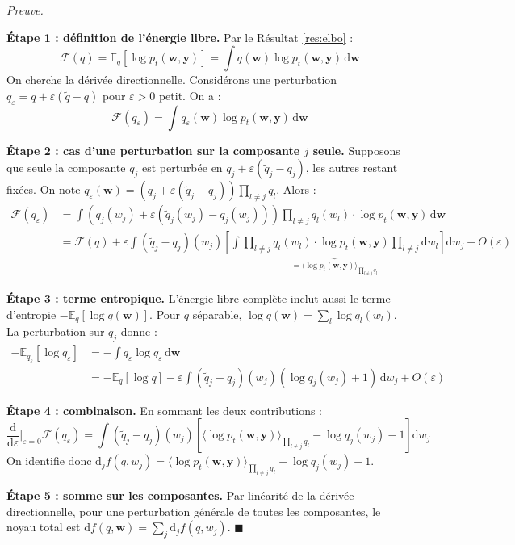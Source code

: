 \documentclass[12pt]{article}
\newcommand{\w}{\boldsymbol{w}}
\newcommand{\y}{\boldsymbol{y}}
\renewcommand{\qedsymbol}{$\blacksquare$}
\renewenvironment{proof}[1][\proofname]{%
  \par\medskip\noindent
  \textit{\color{proofgray}#1.}\enspace\ignorespaces
}{\hfill\qedsymbol\par\medskip}
\renewcommand{\proofname}{Preuve}
\begin{document}
\begin{proof}


\textbf{Étape 1 : définition de l'énergie libre.} Par le Résultat 
\ref{res:elbo} 
:
\[
\mathcal{F}(q) = \mathbb{E}_q[\log p_t(\w, \y)] = \int q(\w) \log p_t(\w, \y)\, \mathrm{d}\w
\]
On cherche la dérivée directionnelle. Considérons une perturbation $q_\varepsilon = q + \varepsilon(\tilde{q} - q)$ pour $\varepsilon > 0$ petit. On a 
:
\[
\mathcal{F}(q_\varepsilon) = \int q_\varepsilon(\w) \log p_t(\w, \y)\, \mathrm{d}\w
\]

\textbf{Étape 2 : cas d'une perturbation sur la composante $j$ seule.} Supposons que seule la composante $q_j$ est perturbée en $q_j + \varepsilon(\tilde{q}_j - q_j)$, les autres restant fixées. On note $q_\varepsilon(\w) = (q_j + \varepsilon(\tilde{q}_j - q_j)) \prod_{l \neq j} q_l$. Alors 
:
\begin{align}
\mathcal{F}(q_\varepsilon) &= \int \left(q_j(w_j) + \varepsilon(\tilde{q}_j(w_j) - q_j(w_j))\right) \prod_{l \neq j} q_l(w_l) \cdot \log p_t(\w, \y)\, \mathrm{d}\w \nonumber \\
&= \mathcal{F}(q) + \varepsilon \int (\tilde{q}_j - q_j)(w_j) \underbrace{\left[\int \prod_{l \neq j} q_l(w_l) \cdot \log p_t(\w, \y) \prod_{l \neq j} \mathrm{d}w_l\right]}_{= \langle \log p_t(\w, \y) \rangle_{\prod_{l \neq j} q_l}} \mathrm{d}w_j + O(\varepsilon)
\end{align}

\textbf{Étape 3 : terme entropique.} L'énergie libre complète inclut aussi le terme d'entropie $-\mathbb{E}_q[\log q(\w)]$. Pour $q$ séparable, $\log q(\w) = \sum_l \log q_l(w_l)$. La perturbation sur $q_j$ donne 
:
\begin{align}
-\mathbb{E}_{q_\varepsilon}[\log q_\varepsilon] &= -\int q_\varepsilon \log q_\varepsilon\, \mathrm{d}\w \nonumber \\
&= -\mathbb{E}_q[\log q] - \varepsilon \int (\tilde{q}_j - q_j)(w_j) (\log q_j(w_j) + 1)\, \mathrm{d}w_j + O(\varepsilon)
\end{align}

\textbf{Étape 4 : combinaison.} En sommant les deux contributions 
:
\[
\frac{\mathrm{d}}{\mathrm{d}\varepsilon}\bigg|_{\varepsilon=0} \mathcal{F}(q_\varepsilon) = \int (\tilde{q}_j - q_j)(w_j) \left[\langle \log p_t(\w, \y) \rangle_{\prod_{l \neq j} q_l} - \log q_j(w_j) - 1\right] \mathrm{d}w_j
\]
On identifie donc $\mathrm{d}_j f(q, w_j) = \langle \log p_t(\w, \y) \rangle_{\prod_{l \neq j} q_l} - \log q_j(w_j) - 1$.

\textbf{Étape 5 : somme sur les composantes.} Par linéarité de la dérivée directionnelle, pour une perturbation générale de toutes les composantes, le noyau total est $\mathrm{d}f(q, \w) = \sum_j \mathrm{d}_j f(q, w_j)$.
\end{proof}
\end{document}

